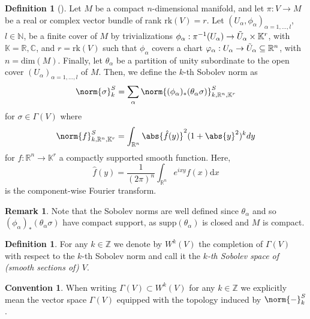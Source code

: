 \documentclass[12pt,a4paper]{article}
\theoremstyle{plain}
\theoremstyle{definition}
\newtheorem{definition}[theorem]{Definition}
\newtheorem{remark}[theorem]{Remark}
\newtheorem{convention}[theorem]{Convention}
\newcommand{\R}{\mathbb{R}}
\newcommand{\N}{\mathbb{N}}
\newcommand{\K}{\mathbb{K}}
\newcommand{\nnorm}[2]{\norm{#1}_{#2}}
\renewcommand{\d}{\mathrm{d}}
\begin{document}
\begin{definition}[{\cite[p.~110f]{Wells07}}]
Let $M$ be a compact $n$-dimensional manifold, and let $\pi:V\to M$ be a real or complex vector bundle of rank $\mathrm{rk}(V)=r$. Let $(U_\alpha,\phi_\alpha)_{\alpha =1,\ldots,l}$, $l\in \N$, be a finite cover of $M$ by trivializations $\phi_\alpha:\pi^{-1}(U_\alpha)\to \Tilde{U}_\alpha \times \K^r$, with $\K=\R,\mathbb C$,  and $r=\mathrm{rk}(V)$ such that $\phi_\alpha$ covers a chart $\varphi_\alpha:U_\alpha\to\Tilde{U}_\alpha\subseteq \R^n$, with $n=\mathrm{dim}(M)$. Finally, let $\theta_\alpha$ be a partition of unity subordinate to the open cover $(U_\alpha)_{\alpha=1,\ldots,l}$ of $M$. Then, we define the $k$-th Sobolev norm as
\begin{equation}
\label{SobolevNorm}
    \nnorm{\sigma}{k}^S=\sum_\alpha \nnorm{(\phi_\alpha)_*(\theta_\alpha \sigma)}{k,\R^n,\K^r}^S
\end{equation}
for $\sigma\in\Gamma(V)$ where 
\begin{equation*}
    \nnorm{f}{k,\R^n,\K^r}^S=\int_{\R^n}\abs{\hat f(y)}^2(1+\abs{y}^2)^kdy
\end{equation*}
for $f:\R^n\to \K^r$ a compactly supported smooth function. Here,  
\begin{equation*}
    \hat f(y)=\frac{1}{(2\pi)^n}\int_{\R^n}e^{ixy}f(x)\d x
\end{equation*}
is the component-wise Fourier transform.    
\end{definition}

\begin{remark}
\label{Rem:SobNormsCompSupp}
Note that the Sobolev norms are well defined since $\theta_\alpha$ and so $(\phi_\alpha)_*(\theta_\alpha\sigma)$ have compact support, as $\mathrm{supp}(\theta_\alpha)$ is closed and $M$ is compact.
\end{remark}

\begin{definition}
For any $k\in \mathbb Z$ we denote by $W^k(V)$ the completion of $\Gamma(V)$ with respect to the $k$-th Sobolev norm and call it the \textit{$k$-th Sobolev space of (smooth sections of) $V$}. 
\end{definition}

\begin{convention}
When writing $\Gamma(V)\subset W^k(V)$ for any $k\in \mathbb Z$ we explicitly mean the vector space $\Gamma(V)$ equipped with the topology induced by $\nnorm{-}{k}^S$.
\end{convention}
\end{document}
